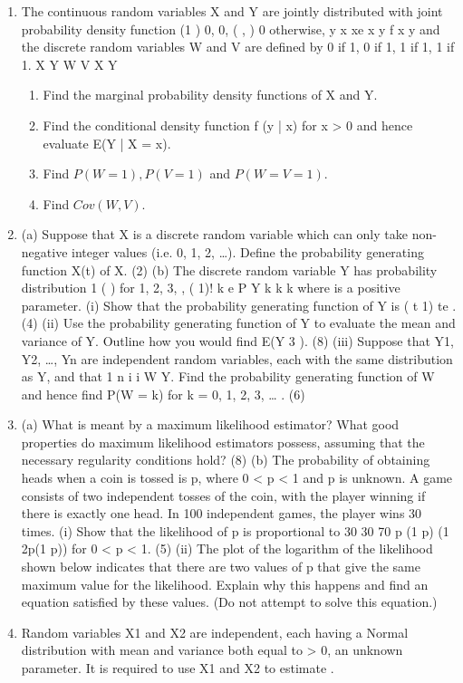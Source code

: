 
\begin{enumerate}
\item The continuous random variables X and Y are jointly distributed with joint probability
density function
(1 ) 0, 0,
( , )
0 otherwise,
y x xe x y
f x y
and the discrete random variables W and V are defined by
0 if 1, 0 if 1,
1 if 1, 1 if 1.
X Y
W V
X Y
\begin{enumerate}
\item Find the marginal probability density functions of X and Y.
\item Find the conditional density function f (y | x) for x > 0 and hence evaluate
E(Y | X = x).
\item Find $P(W = 1), P(V = 1)$ and $P(W = V = 1)$.
\item Find $Cov(W, V)$.
\end{enumerate}
\item (a) Suppose that X is a discrete random variable which can only take non-negative
integer values (i.e. 0, 1, 2, …). Define the probability generating function X(t)
of X.
(2)
(b) The discrete random variable Y has probability distribution
1
( ) for 1, 2, 3, ,
( 1)!
k e
P Y k k
k
where is a positive parameter.
(i) Show that the probability generating function of Y is ( t 1) te .
(4)
(ii) Use the probability generating function of Y to evaluate the mean and
variance of Y. Outline how you would find E(Y
3
).
(8)
(iii) Suppose that Y1, Y2, …, Yn are independent random variables, each with
the same distribution as Y, and that
1
n
i
i
W Y. Find the probability
generating function of W and hence find P(W = k) for k = 0, 1, 2, 3, … .
(6)
\item (a) What is meant by a maximum likelihood estimator? What good properties do
maximum likelihood estimators possess, assuming that the necessary regularity
conditions hold?
(8)
(b) The probability of obtaining heads when a coin is tossed is p, where 0 < p < 1
and p is unknown. A game consists of two independent tosses of the coin, with
the player winning if there is exactly one head. In 100 independent games, the
player wins 30 times.
(i) Show that the likelihood of p is proportional to
30 30 70 p (1 p) (1 2p(1 p))
for 0 < p < 1.
(5)
(ii) The plot of the logarithm of the likelihood shown below indicates that
there are two values of p that give the same maximum value for the
likelihood. Explain why this happens and find an equation satisfied by
these values. (Do not attempt to solve this equation.)
\item Random variables X1 and X2 are independent, each having a Normal distribution with
mean and variance both equal to > 0, an unknown parameter. It is required to use
X1 and X2 to estimate .


\end{enumerate}
